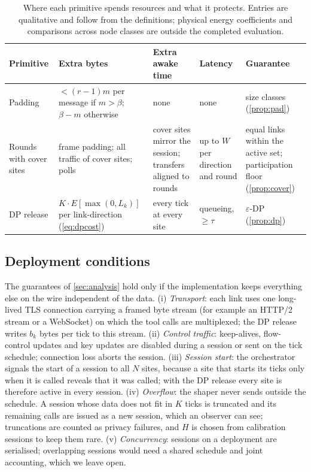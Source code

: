 \begin{table}[t]
\centering
\caption{Where each primitive spends resources and what it protects. Entries are qualitative and follow from the definitions; physical energy coefficients and comparisons across node classes are outside the completed evaluation.}\label{tab:primitives}
\footnotesize
\begin{tabular}{@{}p{2.6cm}p{3.9cm}p{3.6cm}p{2.9cm}p{3.6cm}@{}}
\toprule
Primitive & Extra bytes & Extra awake time & Latency & Guarantee \\
\midrule
Padding & $<(r{-}1)m$ per message if $m>\beta$; $\beta-m$ otherwise & none & none & size classes (\cref{prop:pad}) \\
Rounds with cover sites & frame padding; all traffic of cover sites; polls & cover sites mirror the session; transfers aligned to rounds & up to $W$ per direction and round & equal links within the active set; participation floor (\cref{prop:cover}) \\
DP release & $K\cdot E[\max(0,L_k)]$ per link-direction (\cref{eq:dpcost}) & every tick at every site & queueing, ${\ge}\tau$ & $\varepsilon$-DP (\cref{prop:dp}) \\
\bottomrule
\end{tabular}
\end{table}

\subsection{Deployment conditions}\label{sec:deploy}
The guarantees of \cref{sec:analysis} hold only if the implementation keeps everything else on the wire independent of the data. (i) \emph{Transport}: each link uses one long-lived TLS connection carrying a framed byte stream (for example an HTTP/2 stream or a WebSocket) on which the tool calls are multiplexed; the DP release writes $b_k$ bytes per tick to this stream. (ii) \emph{Control traffic}: keep-alives, flow-control updates and key updates are disabled during a session or sent on the tick schedule; connection loss aborts the session. (iii) \emph{Session start}: the orchestrator signals the start of a session to all $N$ sites, because a site that starts its ticks only when it is called reveals that it was called; with the DP release every site is therefore active in every session. (iv) \emph{Overflow}: the shaper never sends outside the schedule. A session whose data does not fit in $K$ ticks is truncated and its remaining calls are issued as a new session, which an observer can see; truncations are counted as privacy failures, and $H$ is chosen from calibration sessions to keep them rare. (v) \emph{Concurrency}: sessions on a deployment are serialised; overlapping sessions would need a shared schedule and joint accounting, which we leave open.

